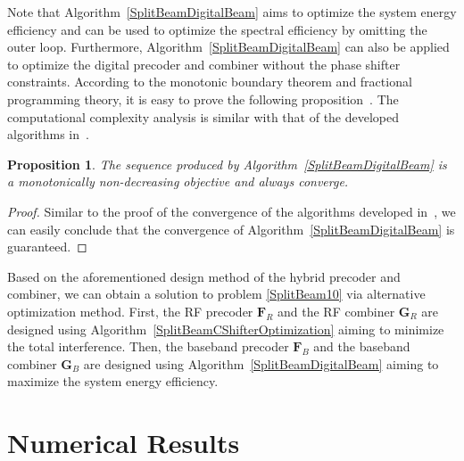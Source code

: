 \documentclass[11pt,draftcls,onecolumn]{IEEEtran}
\newtheorem{proposition}{Proposition}
\begin{document}
Note that Algorithm~\ref{SplitBeamDigitalBeam} aims to optimize the system energy efficiency and can be used to optimize the spectral efficiency by omitting the outer loop. Furthermore, Algorithm~\ref{SplitBeamDigitalBeam} can also be applied to optimize the digital precoder and combiner without the phase shifter constraints. According to the monotonic boundary theorem and fractional programming theory, it is easy to prove the following proposition~\cite{JstorJagan1966,JstorDink1967,Bibby1974}. The computational complexity analysis is similar with that of the developed algorithms in~\cite{TCOMHE2013,TSPHE2014}.
\begin{proposition}\label{SplitBeamPros02}
The sequence produced by Algorithm~\ref{SplitBeamDigitalBeam} is a monotonically non-decreasing objective and always converge.
\end{proposition}
\begin{proof}
Similar to the proof of the convergence of the algorithms developed in~\cite{TCOMHE2013,TSPHE2014}, we can easily conclude that the convergence of Algorithm~\ref{SplitBeamDigitalBeam} is guaranteed.
\end{proof}

Based on the aforementioned design method of the hybrid precoder and combiner, we can obtain a solution to problem \eqref{SplitBeam10} via alternative optimization method. First, the RF precoder $\bm{F}_{R}$ and the RF combiner $\bm{G}_{R}$ are designed using Algorithm~\ref{SplitBeamCShifterOptimization} aiming to minimize the total interference. Then, the baseband precoder $\bm{F}_{B}$ and the baseband combiner $\bm{G}_{B}$ are designed using Algorithm~\ref{SplitBeamDigitalBeam} aiming to maximize the system energy efficiency.%

\section{Numerical Results}
\end{document}
